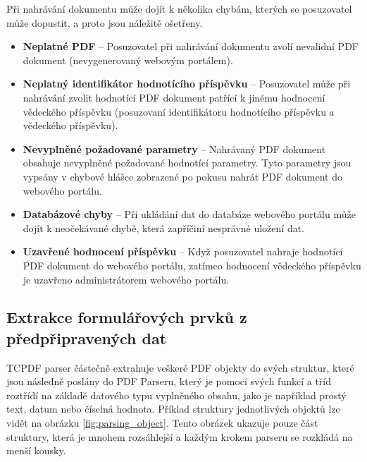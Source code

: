 \par
Při nahrávání dokumentu může dojít k několika chybám, kterých se posuzovatel může dopustit, a proto jsou náležitě ošetřeny.
\begin{itemize}
	\item \textbf{Neplatné PDF} -- Posuzovatel při nahrávání dokumentu zvolí nevalidní PDF dokument (nevygenerovaný webovým portálem).
	\item \textbf{Neplatný identifikátor hodnotícího příspěvku} -- Posuzovatel může při nahrávání zvolit hodnotící PDF dokument patřící k jinému hodnocení vědeckého příspěvku (posuzovaní identifikátoru hodnotícího příspěvku a vědeckého příspěvku).
	\item \textbf{Nevyplněné požadované parametry} -- Nahrávaný PDF dokument obsahuje nevyplněné požadované hodnotící parametry. Tyto parametry jsou vypsány v chybové hlášce zobrazené po pokusu nahrát PDF dokument do webového portálu.
	\item \textbf{Databázové chyby} -- Při ukládání dat do databáze webového portálu může dojít k neočekávané chybě, která zapříčiní nesprávné uložení dat. 
	\item \textbf{Uzavřené hodnocení příspěvku} -- Když posuzovatel nahraje hodnotící PDF dokument do webového portálu, zatímco hodnocení vědeckého příspěvku je uzavřeno administrátorem webového portálu.
\end{itemize}

\subsection{Extrakce formulářových prvků z předpřipravených dat}
TCPDF parser částečně extrahuje veškeré PDF objekty do svých struktur, které jsou následně poslány do PDF Parseru, který je pomocí svých funkcí a tříd roztřídí na základě datového typu vyplněného obsahu, jako je například prostý text, datum nebo číselná hodnota. Příklad struktury jednotlivých objektů lze vidět na obrázku \ref{fig:parsing_object}. Tento obrázek ukazuje pouze část struktury, která je mnohem rozsáhlejší a každým krokem parseru se rozkládá na menší kousky.


